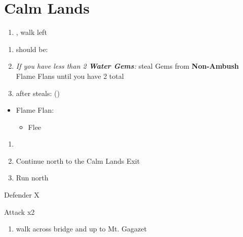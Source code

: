\chapter{Calm Lands}

\begin{enumerate}
    \item \sd, walk left
\end{enumerate}
\begin{spheregrid}
    \begin{itemize}
        \yunaf
    \end{itemize}
\end{spheregrid}
\begin{enumerate}[resume]
    \item should be: \formation{\tidus}{\yuna}{\kimahri}
    \item \textit{If you have less than 2 \textbf{Water Gems}:} steal Gems from \textbf{Non-Ambush} Flame Flans until you have 2 total
    \item after steals: \formation{\tidus}{\rikku}{\kimahri} (\swap{\yuna}{\rikku})
\end{enumerate}
\begin{encounters}
    \begin{itemize}
        \item Flame Flan:
        \begin{itemize}
            \rikkuf Steal
            \item Flee
        \end{itemize}
    \end{itemize}
\end{encounters}
\begin{enumerate}[resume]
    \item \formation{\tidus}{\rikku}{\kimahri}
    \item Continue north to the Calm Lands Exit
    \item Run north
\end{enumerate}
\begin{battle}[64000]{Defender X}
    \begin{itemize}
        \switch{\tidus}{\yuna}
        \summon{\bahamut}
        \bahamutf Attack x2
    \end{itemize}
\end{battle}
\begin{enumerate}[resume]
    \item walk across bridge and up to Mt. Gagazet
\end{enumerate}
